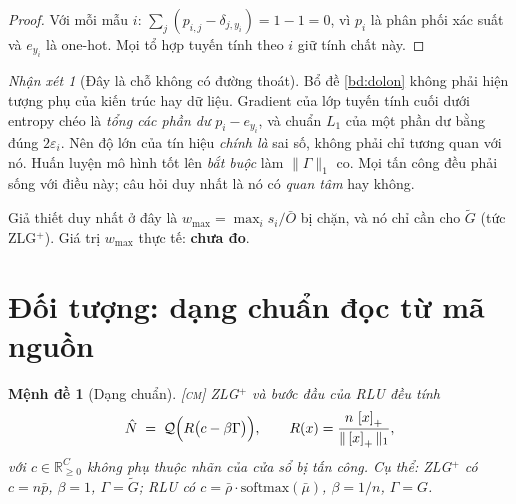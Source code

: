 \documentclass[11pt,a4paper]{article}
\newtheorem{menhde}[dinhly]{Mệnh đề}
\theoremstyle{remark}
\newtheorem{nhanxet}[dinhly]{Nhận xét}
\newcommand{\R}{\mathbb{R}}
\newcommand{\pos}[1]{\left[#1\right]_+}
\newcommand{\quant}{\mathcal{Q}}
\begin{document}
\begin{proof}
Với mỗi mẫu $i$: $\sum_j(p_{i,j}-\delta_{j,y_i})=1-1=0$, vì $p_i$ là phân
phối xác suất và $e_{y_i}$ là one-hot. Mọi tổ hợp tuyến tính theo $i$ giữ
tính chất này.
\end{proof}

\begin{nhanxet}[Đây là chỗ không có đường thoát]
\label{nx:khongthoat}
Bổ đề \ref{bd:dolon} không phải hiện tượng phụ của kiến trúc hay dữ liệu.
Gradient của lớp tuyến tính cuối dưới entropy chéo là \emph{tổng các phần dư}
$p_i-e_{y_i}$, và chuẩn $L_1$ của một phần dư bằng đúng $2\varepsilon_i$. Nên
độ lớn của tín hiệu \emph{chính là} sai số, không phải chỉ tương quan với nó.
Huấn luyện mô hình tốt lên \emph{bắt buộc} làm $\|\Gamma\|_1$ co. Mọi tấn
công đều phải sống với điều này; câu hỏi duy nhất là nó có \emph{quan tâm}
hay không.

Giả thiết duy nhất ở đây là $w_{\max}=\max_i s_i/\bar O$ bị chặn, và nó chỉ
cần cho $\tilde G$ (tức ZLG$^+$). Giá trị $w_{\max}$ thực tế: \textbf{chưa
đo}.
\end{nhanxet}

\section{Đối tượng: dạng chuẩn đọc từ mã nguồn}
\label{sec:dang-chuan}

\begin{menhde}[Dạng chuẩn]
\label{md:dangchuan}
\textsc{[cm]}\; ZLG$^+$ và bước đầu của RLU đều tính
\begin{equation}
\hat N\;=\;\quant\Bigl(R\bigl(c-\beta\Gamma\bigr)\Bigr),
\qquad R(x)=\frac{n\,\pos{x}}{\|\pos{x}\|_1},
\label{eq:dangchuan}
\end{equation}
với $c\in\R^C_{\ge0}$ \emph{không phụ thuộc nhãn của cửa sổ bị tấn công}. Cụ
thể: ZLG$^+$ có $c=n\bar p$, $\beta=1$, $\Gamma=\tilde G$; RLU có
$c=\bar\rho\cdot\mathrm{softmax}(\bar\mu)$, $\beta=1/n$, $\Gamma=G$.
\end{menhde}
\end{document}
